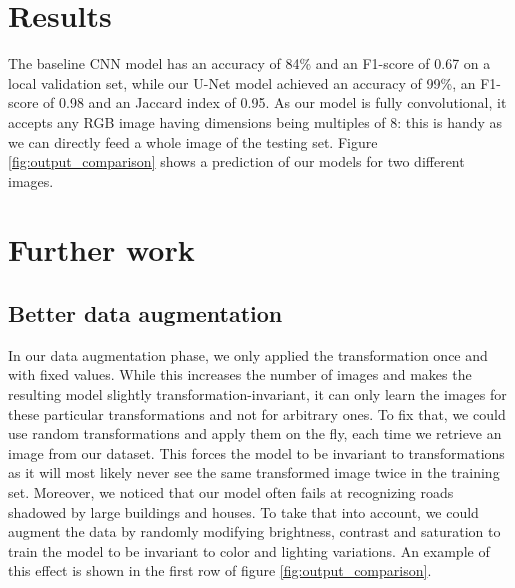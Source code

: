 \documentclass[10pt,conference,compsocconf]{IEEEtran}
\begin{document}
\section{Results}

The baseline CNN model has an accuracy of 84\% and an F1-score of 0.67 on a local validation set, while our U-Net model achieved an accuracy of 99\%, an F1-score of 0.98 and an Jaccard index of 0.95. As our model is fully convolutional, it accepts any RGB image having dimensions being multiples of 8: this is handy as we can directly feed a whole image of the testing set. Figure \ref{fig:output_comparison} shows a prediction of our models for two different images. 

\section{Further work}

\subsection{Better data augmentation}
In our data augmentation phase, we only applied the transformation once and with fixed values. While this increases the number of images and makes the resulting model slightly transformation-invariant, it can only learn the images for these particular transformations and not for arbitrary ones. To fix that, we could use random transformations and apply them on the fly, each time we retrieve an image from our dataset. This forces the model to be invariant to transformations as it will most likely never see the same transformed image twice in the training set. Moreover, we noticed that our model often fails at recognizing roads shadowed by large buildings and houses. To take that into account, we could augment the data by randomly modifying brightness, contrast and saturation to train the model to be invariant to color and lighting variations. An example of this effect is shown in the first row of figure \ref{fig:output_comparison}.
\end{document}
